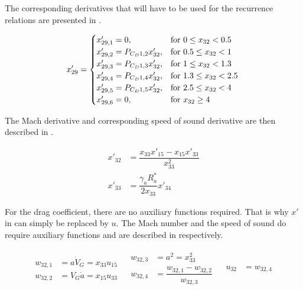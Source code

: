 The corresponding derivatives that will have to be used for the recurrence relations are presented in .

\begin{equation}\label{eq:cdCondDer}
x'_{29}=\begin{cases}
x'_{29,1}=0, & \text{for } 0\leq x_{32} < 0.5\\
x'_{29,2}=P_{C_{D} 1,2}x'_{32}, &  \text{for } 0.5\leq x_{32} < 1 \\
x'_{29,3}=P_{C_{D} 1,3}x'_{32}, &  \text{for } 1\leq x_{32} < 1.3 \\
x'_{29,4}=P_{C_{D} 1,4}x'_{32}, &  \text{for } 1.3\leq x_{32} < 2.5 \\
x'_{29,5}=P_{C_{D} 1,5}x'_{32}, &  \text{for } 2.5\leq x_{32} < 4 \\
x'_{29,6}=0, &  \text{for } x_{32} \geq 4 
\end{cases}\\
\end{equation}

The Mach derivative and corresponding speed of sound derivative are then described in .

 \begin{equation} \label{eq:cdDerAux}
\begin{split}
x'_{32} &= \dfrac{x_{33}x'_{15}-x_{15}x'_{33}}{x_{33}^{2}}\\
x'_{33} &= \dfrac{\gamma_{a}R_{a}^{*}}{2x_{33}}x'_{34} 
\end{split}
\end{equation}

For the drag coefficient, there are no auxiliary functions required. That is why $x'$ in  can simply be replaced by $u$. The Mach number and the speed of sound do require auxiliary functions and are described in  respectively.

\begin{align} \label{eq:u32}
\begin{split}
w_{32,1} &= a\dot{V}_{G} = x_{33}u_{15} \\
w_{32,2} &= V_{G}\dot{a} = x_{15}u_{33} \\
\end{split}
&
\begin{split}
w_{32,3} &= a^{2} = x_{33}^2 \\
w_{32,4} &= \dfrac{w_{32,1}-w_{32,2}}{w_{32,3}} \\
\end{split}
&
\begin{split}
u_{32} &= w_{32,4} \\
\end{split}
\end{align}

